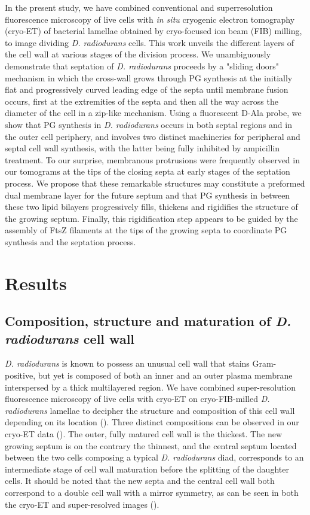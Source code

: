 In the present study, we have combined conventional and super\-resolution fluorescence microscopy of live cells with \textit{in situ} cryogenic electron tomography (cryo-ET) of bacterial lamellae obtained by cryo-focused ion beam (FIB) milling, to image dividing \textit{D. radiodurans} cells.
This work unveils the different layers of the cell wall at various stages of the division process.
We unambiguously demonstrate that septation of \textit{D. radiodurans} proceeds by a "sliding doors" mechanism in which the cross-wall grows through PG synthesis at the initially flat and progressively curved leading edge of the septa until membrane fusion occurs, first at the extremities of the septa and then all the way across the diameter of the cell in a zip-like mechanism.
Using a fluorescent D-Ala probe, we show that PG synthesis in \textit{D. radiodurans} occurs in both septal regions and in the outer cell periphery, and involves two distinct machineries for peripheral and septal cell wall synthesis, with the latter being fully inhibited by ampicillin treatment.
To our surprise, membranous protrusions were frequently observed in our tomograms at the tips of the closing septa at early stages of the septation process.
We propose that these remarkable structures may constitute a preformed dual membrane layer for the future septum and that PG synthesis in between these two lipid bilayers progressively fills, thickens and rigidifies the structure of the growing septum.
Finally, this rigidification step appears to be guided by the assembly of FtsZ filaments at the tips of the growing septa to coordinate PG synthesis and the septation process.

\section{Results}

\subsection[Cell wall composition and maturation]{Composition, structure and maturation of \textit{D. radiodurans} cell wall}

\textit{D. radiodurans} is known to possess an unusual cell wall that stains Gram-positive, but yet is composed of both an inner and an outer plasma membrane interspersed by a thick multilayered region.
We have combined super-resolution fluorescence microscopy of live cells with cryo-ET on cryo-FIB-milled \textit{D. radiodurans} lamellae to decipher the structure and composition of this cell wall depending on its location ().
Three distinct compositions can be observed in our cryo-ET data ().
The outer, fully matured cell wall is the thickest.
The new growing septum is on the contrary the thinnest, and the central septum located between the two cells composing a typical \textit{D. radiodurans} diad, corresponds to an intermediate stage of cell wall maturation before the splitting of the daughter cells.
It should be noted that the new septa and the central cell wall both correspond to a double cell wall with a mirror symmetry, as can be seen in both the cryo-ET and super-resolved images ().

